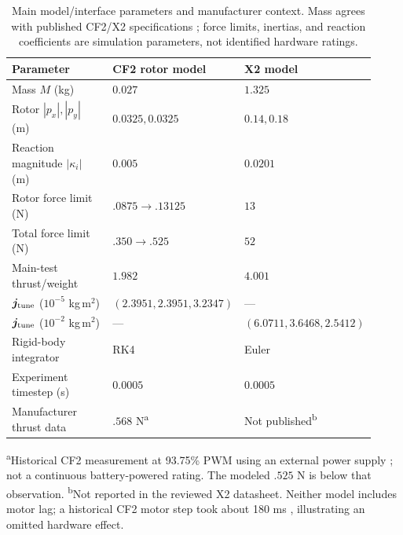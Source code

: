 \documentclass[letterpaper, 10 pt, conference]{ieeeconf}
\begin{document}
\begin{table}[t]
\centering
\caption{Main model/interface parameters and manufacturer context.
Mass agrees with published CF2/X2 specifications \cite{bitcrazeCF20Specs,skydioX2ESpecs}; force limits, inertias, and reaction coefficients are simulation parameters, not identified hardware ratings.}
\label{tab:models}
\setlength{\tabcolsep}{3pt}
\footnotesize
\begin{tabular}{@{}p{0.40\linewidth}p{0.27\linewidth}p{0.25\linewidth}@{}}
\toprule
Parameter & CF2 rotor model & X2 model\\
\midrule
Mass $M$ (kg) & $0.027$ & $1.325$\\
Rotor $|p_x|,|p_y|$ (m) & $0.0325,0.0325$ & $0.14,0.18$\\
Reaction magnitude $|\kappa_i|$ (m) & $0.005$ & $0.0201$\\
Rotor force limit (N) & $.0875\to.13125$ & $13$\\
Total force limit (N) & $.350\to.525$ & $52$\\
Main-test thrust/weight & $1.982$ & $4.001$\\
$\bm j_{\rm tune}$ ($10^{-5}$ kg\,m$^2$) & $(2.3951,\allowbreak2.3951,\allowbreak3.2347)$ & ---\\
$\bm j_{\rm tune}$ ($10^{-2}$ kg\,m$^2$) & --- & $(6.0711,\allowbreak3.6468,\allowbreak2.5412)$\\
Rigid-body integrator & RK4 & Euler\\
Experiment timestep (s) & $0.0005$ & $0.0005$\\
Manufacturer thrust data & $.568$ N\textsuperscript{a} & Not published\textsuperscript{b}\\
\bottomrule
\end{tabular}
\par\smallskip
\begin{minipage}{0.97\linewidth}
\scriptsize
\textsuperscript{a}Historical CF2 measurement at 93.75\% PWM using an external power supply \cite{bitcrazeThrustMeasurements}; not a continuous battery-powered rating. The modeled $.525$ N is below that observation.
\textsuperscript{b}Not reported in the reviewed X2 datasheet. Neither model includes motor lag; a historical CF2 motor step took about 180 ms \cite{bitcrazeMotorResponse}, illustrating an omitted hardware effect.
\end{minipage}
\end{table}
\end{document}
